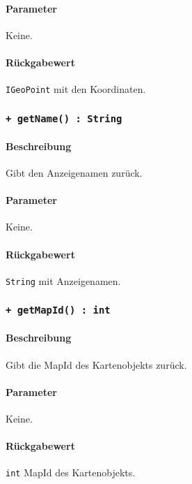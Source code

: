\paragraph*{Parameter}
Keine.
\paragraph*{Rückgabewert}
\texttt{IGeoPoint} mit den Koordinaten.

\subsubsection*{\texttt{+ getName() : String}}%
\paragraph*{Beschreibung}
Gibt den Anzeigenamen zurück.
\paragraph*{Parameter}
Keine.
\paragraph*{Rückgabewert}
\texttt{String} mit Anzeigenamen.

\subsubsection*{\texttt{+ getMapId() : int}}%
\paragraph*{Beschreibung}
Gibt die MapId des Kartenobjekts zurück.
\paragraph*{Parameter}
Keine.
\paragraph*{Rückgabewert}
\texttt{int} MapId des Kartenobjekts.